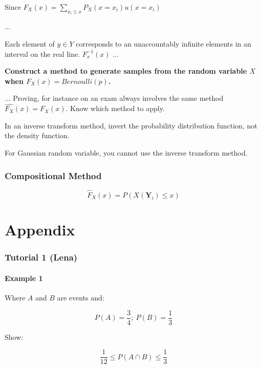 \documentclass{report}
\renewcommand\appendix{\par
  \setcounter{section}{0}
  \setcounter{subsection}{0}
  \setcounter{figure}{0}
  \setcounter{table}{0}
  \renewcommand\thesection{Appendix \Alph{section}}
  \renewcommand\thefigure{\Alph{section}\arabic{figure}}
  \renewcommand\thetable{\Alph{section}\arabic{table}}
}
\begin{document}
Since $F_X(x) = \sum_{x_i \leq x} P_X(x = x_i) u(x=x_i)$

...

Each element of $y \in Y$ corresponds to an unaccountably infinite elements in an interval on the real line. $F_x^{-1}(x)$ ...


\textbf{Construct a method to generate samples from the random variable $X$ when $F_X(x) = Bernoulli(p)$.}

... Proving, for instance on an exam always involves the same method $\hat{F_X}(x) = F_X(x)$. Know which method to apply. 

In an inverse transform method, invert the probability distribution function, not the density function.

For Gaussian random variable, you cannot use the inverse transform method.

\subsection{Compositional Method}

$$\hat{F}_X(x) = P(X(\mathbf{Y}_i) \leq x)$$







\newpage

 
\pagebreak


\appendix
\onehalfspacing
\chapter*{Appendix}
\renewcommand{\thesubsection}{\Alph{subsection}}

\subsection{Tutorial 1 (Lena)}

\subsubsection*{Example 1}

Where $A$ and $B$ are events and:

$$P(A) = \frac{3}{4};\ P(B)=\frac{1}{3}$$

Show:

$$\frac{1}{12} \leq P(A \cap B) \leq \frac{1}{3}$$
\end{document}
